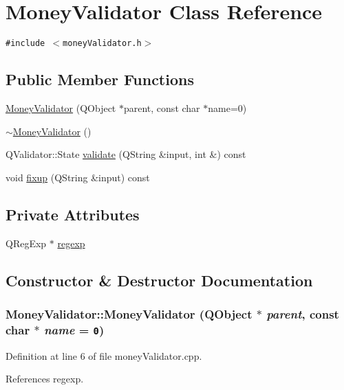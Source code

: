 \hypertarget{classMoneyValidator}{
\section{Money\-Validator Class Reference}
\label{classMoneyValidator}
}
{\tt \#include $<$money\-Validator.h$>$}

\subsection*{Public Member Functions}
\begin{CompactItemize}
\item 
\hyperlink{classMoneyValidator_a0}{Money\-Validator} (QObject $\ast$parent, const char $\ast$name=0)
\item 
\hyperlink{classMoneyValidator_a1}{$\sim$Money\-Validator} ()
\item 
QValidator::State \hyperlink{classMoneyValidator_a2}{validate} (QString \&input, int \&) const
\item 
void \hyperlink{classMoneyValidator_a3}{fixup} (QString \&input) const
\end{CompactItemize}
\subsection*{Private Attributes}
\begin{CompactItemize}
\item 
QReg\-Exp $\ast$ \hyperlink{classMoneyValidator_r0}{regexp}
\end{CompactItemize}


\subsection{Constructor \& Destructor Documentation}
\hypertarget{classMoneyValidator_a0}{
\subsubsection[MoneyValidator]{\setlength{\rightskip}{0pt plus 5cm}Money\-Validator::Money\-Validator (QObject $\ast$ {\em parent}, const char $\ast$ {\em name} = {\tt 0})}}
\label{classMoneyValidator_a0}


Definition at line 6 of file money\-Validator.cpp.

References regexp.

